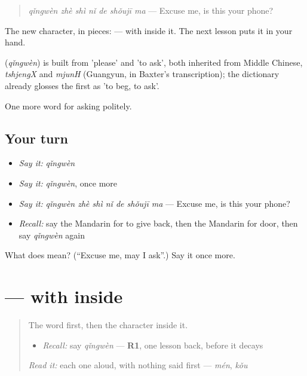 \begin{quote}
\textbf{} \emph{qǐngwèn zhè shì nǐ de shǒujī ma} — Excuse me, is this your phone?
\end{quote}

The new character, in pieces:  —  with  inside it. The next lesson puts it in your hand.

\begin{cousinweb}
\textbf{} (\emph{qǐngwèn}) is built from  'please' and  'to ask', both inherited from Middle Chinese, \emph{tshjengX} and \emph{mjunH} (Guangyun, in Baxter's transcription); the dictionary already glosses the first as 'to beg, to ask'.
\end{cousinweb}

\begin{grammarlens}[title={What you've built}]
One more word for asking politely.
\end{grammarlens}

\subsection*{Your turn}
\begin{itemize}
\raggedright
  \item \emph{Say it:} \emph{qǐngwèn}
  \item \emph{Say it:} \emph{qǐngwèn}, once more
  \item \emph{Say it:} \emph{qǐngwèn zhè shì nǐ de shǒujī ma} — Excuse me, is this your phone?
  \item \emph{Recall:} say the Mandarin for to give back, then the Mandarin for door, then say \emph{qǐngwèn} again
\end{itemize}

\begin{tcolorbox}[breakable,colback=teal!4,colframe=teal!35!black,title={Before you move on}]
What does  mean? (\textquotedblleft{}Excuse me, may I ask\textquotedblright{}.) Say it once more.
\end{tcolorbox}
\section[\texorpdfstring{\zh{问} (wèn)}{问 (wèn)}]{ —  with  inside}

\label{lesson:ZH-W65-wen-ask}



\begin{quote}
The word first, then the character inside it.

\begin{itemize}
\raggedright
  \item \emph{Recall:} say \emph{qǐngwèn} — \textbf{R1}, one lesson back, before it decays
\end{itemize}

\begin{quote}
 
\end{quote}

\emph{Read it:} each one aloud, with nothing said first — \emph{mén}, \emph{kǒu}
\end{quote}

